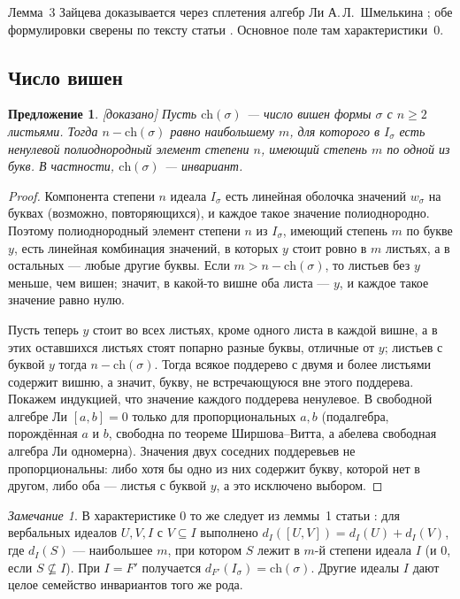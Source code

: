 \documentclass[11pt]{article}
\newcommand{\cher}{\mathrm{ch}}
\newcommand{\stat}[1]{\textsf{\small[#1]}}
\newcommand{\proved}{\stat{доказано}}
\theoremstyle{plain}
\newtheorem{proposition}[theorem]{Предложение}
\theoremstyle{definition}
\theoremstyle{remark}
\newtheorem{remark}[theorem]{Замечание}
\begin{document}
Лемма~3 Зайцева доказывается через сплетения алгебр Ли А.\,Л.~Шмелькина \cite{Shm}; обе формулировки сверены по тексту статьи \cite{Z81}. Основное поле там характеристики~$0$.

\subsection{Число вишен}

\begin{proposition}\label{prop:cherries} \proved{}
Пусть $\cher(\sigma)$ --- число вишен формы $\sigma$ с $n\ge2$ листьями. Тогда $n-\cher(\sigma)$ равно наибольшему $m$, для которого в $I_\sigma$ есть ненулевой полиоднородный элемент степени $n$, имеющий степень $m$ по одной из букв. В частности, $\cher(\sigma)$ --- инвариант.
\end{proposition}
\begin{proof}
Компонента степени $n$ идеала $I_\sigma$ есть линейная оболочка значений $w_\sigma$ на буквах (возможно, повторяющихся), и каждое такое значение полиоднородно. Поэтому полиоднородный элемент степени $n$ из $I_\sigma$, имеющий степень $m$ по букве $y$, есть линейная комбинация значений, в которых $y$ стоит ровно в $m$ листьях, а в остальных --- любые другие буквы. Если $m>n-\cher(\sigma)$, то листьев без $y$ меньше, чем вишен; значит, в какой-то вишне оба листа --- $y$, и каждое такое значение равно нулю.

Пусть теперь $y$ стоит во всех листьях, кроме одного листа в каждой вишне, а в этих оставшихся листьях стоят попарно разные буквы, отличные от $y$; листьев с буквой $y$ тогда $n-\cher(\sigma)$. Тогда всякое поддерево с двумя и более листьями содержит вишню, а значит, букву, не встречающуюся вне этого поддерева. Покажем индукцией, что значение каждого поддерева ненулевое. В свободной алгебре Ли $[a,b]=0$ только для пропорциональных $a,b$ (подалгебра, порождённая $a$ и $b$, свободна по теореме Ширшова--Витта, а абелева свободная алгебра Ли одномерна). Значения двух соседних поддеревьев не пропорциональны: либо хотя бы одно из них содержит букву, которой нет в другом, либо оба --- листья с буквой $y$, а это исключено выбором.
\end{proof}

\begin{remark}
В характеристике $0$ то же следует из леммы~1 статьи \cite{Z98}: для вербальных идеалов $U,V,I$ с $V\subseteq I$ выполнено $d_I([U,V])=d_I(U)+d_I(V)$, где $d_I(S)$ --- наибольшее $m$, при котором $S$ лежит в $m$-й степени идеала $I$ (и $0$, если $S\not\subseteq I$). При $I=F'$ получается $d_{F'}(I_\sigma)=\cher(\sigma)$. Другие идеалы $I$ дают целое семейство инвариантов того же рода.
\end{remark}
\end{document}
